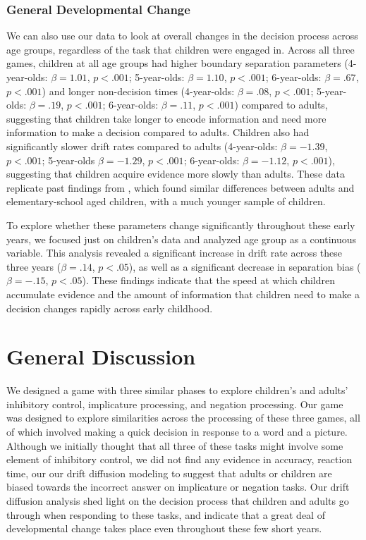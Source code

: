 \documentclass[10pt,letterpaper]{article}
\begin{document}
\subsubsection{General Developmental Change}
We can also use our data to look at overall changes in the decision process across age groups, regardless of the task that children were engaged in. Across all three games, children at all age groups had higher boundary separation parameters (4-year-olds: $\beta = 1.01$, $p <.001$; 5-year-olds: $\beta = 1.10$, $p <.001$; 6-year-olds: $\beta = .67$, $p <.001$) and longer non-decision times (4-year-olds: $\beta = .08$, $p <.001$; 5-year-olds: $\beta = .19$, $p <.001$; 6-year-olds: $\beta = .11$, $p <.001$) compared to adults, suggesting that children take longer to encode information and need more information to make a decision compared to adults.  Children also had significantly slower drift rates compared to adults (4-year-olds: $\beta = -1.39$, $p <.001$; 5-year-olds $\beta = -1.29$, $p <.001$; 6-year-olds: $\beta = -1.12$, $p <.001$), suggesting that children acquire evidence more slowly than adults.  These data replicate past findings from , which found similar differences between adults and elementary-school aged children, with a much younger sample of children.  

To explore whether these parameters change significantly throughout these early years, we focused just on children's data and analyzed age group as a continuous variable.  This analysis revealed a significant increase in drift rate across these three years ($\beta = .14$, $p < .05$), as well as a significant decrease in separation bias ($\beta = -.15$, $p < .05$).  These findings indicate that the speed at which children accumulate evidence and the amount of information that children need to make a decision changes rapidly across early childhood.  

\section{General Discussion}

We designed a game with three similar phases to explore children's and adults' inhibitory control, implicature processing, and negation processing.  Our game was designed to explore similarities across the processing of these three games, all of which involved making a quick decision in response to a word and a picture.  Although we initially thought that all three of these tasks might involve some element of inhibitory control, we did not find any evidence in accuracy, reaction time, our our drift diffusion modeling to suggest that adults or children are biased towards the incorrect answer on implicature or negation tasks.  Our drift diffusion analysis shed light on the decision process that children and adults go through when responding to these tasks, and indicate that a great deal of developmental change takes place even throughout these few short years.
\end{document}
